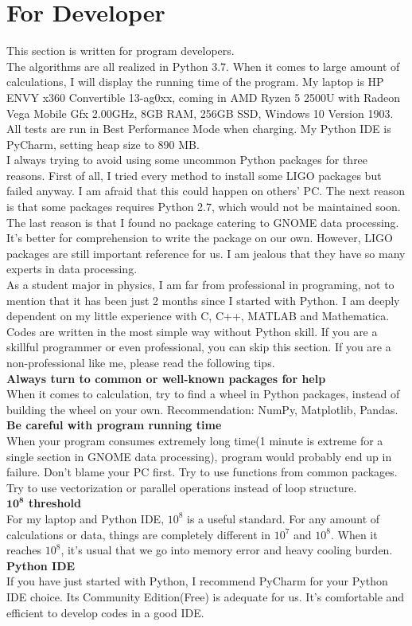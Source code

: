 \documentclass[
12pt, %
a4paper %
]{extreport}
\theoremstyle{plain}
\begin{document}
\section{For Developer}
This section is written for program developers.\\
The algorithms are all realized in Python 3.7. When it comes to large amount of calculations, I will display the running time of the program. My laptop is HP ENVY x360 Convertible 13-ag0xx, coming in AMD Ryzen 5 2500U with Radeon Vega Mobile Gfx 2.00GHz, 8GB RAM, 256GB SSD, Windows 10 Version 1903. All tests are run in Best Performance Mode when charging. My Python IDE is PyCharm, setting heap size to 890 MB.\\
I always trying to avoid using some uncommon Python packages for three reasons. First of all, I tried every method to install some LIGO packages but failed anyway. I am afraid that this could happen on others’ PC. The next reason is that some packages requires Python 2.7, which would not be maintained soon. The last reason is that I found no package catering to GNOME data processing. It’s better for comprehension to write the package on our own. However, LIGO packages are still important reference for us. I am jealous that they have so many experts in data processing.\\
As a student major in physics, I am far from professional in programing, not to mention that it has been just 2 months since I started with Python. I am deeply dependent on my little experience with C, C++, MATLAB and Mathematica. Codes are written in the most simple way without Python skill. If you are a skillful programmer or even professional, you can skip this section. If you are a non-professional like me, please read the following tips.\\
\textbf{Always turn to common or well-known packages for help}\\
When it comes to calculation, try to find a wheel in Python packages, instead of building the wheel on your own. Recommendation: NumPy, Matplotlib, Pandas.
\textbf{Be careful with program running time}\\
When your program consumes extremely long time(1 minute is extreme for a single section in GNOME data processing), program would probably end up in failure. Don’t blame your PC first. Try to use functions from common packages. Try to use vectorization or parallel operations instead of loop structure.\\
\textbf {$\bm{10^{8}}$ threshold}\\
For my laptop and Python IDE, $10^{8}$ is a useful standard. For any amount of calculations or data, things are completely different in $10^{7}$ and $10^{8}$. When it reaches $10^{8}$, it’s usual that we go into memory error and heavy cooling burden.\\
\textbf{Python IDE}\\
If you have just started with Python, I recommend PyCharm for your Python IDE choice. Its Community Edition(Free) is adequate for us. It’s comfortable and efficient to develop codes in a good IDE.
\end{document}
